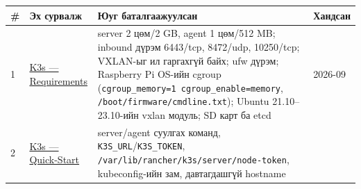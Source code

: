\begingroup\scriptsize\begin{longtable}[]{@{}llll@{}}
\toprule
\begin{minipage}[b]{0.22\columnwidth}\raggedright
\#\strut
\end{minipage} & \begin{minipage}[b]{0.22\columnwidth}\raggedright
Эх сурвалж\strut
\end{minipage} & \begin{minipage}[b]{0.22\columnwidth}\raggedright
Юуг баталгаажуулсан\strut
\end{minipage} & \begin{minipage}[b]{0.22\columnwidth}\raggedright
Хандсан\strut
\end{minipage}\tabularnewline
\midrule
\endhead
\begin{minipage}[t]{0.22\columnwidth}\raggedright
1\strut
\end{minipage} & \begin{minipage}[t]{0.22\columnwidth}\raggedright
\href{https://docs.k3s.io/installation/requirements}{K3s --- Requirements}\strut
\end{minipage} & \begin{minipage}[t]{0.22\columnwidth}\raggedright
server 2 цөм/2 GB, agent 1 цөм/512 MB; inbound дүрэм 6443/tcp, 8472/udp, 10250/tcp; VXLAN-ыг ил гаргахгүй байх; ufw дүрэм; Raspberry Pi OS-ийн cgroup (\texttt{cgroup\_\allowbreak{}memory=\allowbreak{}1\ cgroup\_\allowbreak{}enable=\allowbreak{}memory}, \texttt{/\allowbreak{}boot/\allowbreak{}firmware/\allowbreak{}cmdline.\allowbreak{}txt}); Ubuntu 21.10--23.10-ийн vxlan модуль; SD карт ба etcd\strut
\end{minipage} & \begin{minipage}[t]{0.22\columnwidth}\raggedright
2026-09\strut
\end{minipage}\tabularnewline
\begin{minipage}[t]{0.22\columnwidth}\raggedright
2\strut
\end{minipage} & \begin{minipage}[t]{0.22\columnwidth}\raggedright
\href{https://docs.k3s.io/quick-start}{K3s --- Quick-Start}\strut
\end{minipage} & \begin{minipage}[t]{0.22\columnwidth}\raggedright
server/agent суулгах команд, \texttt{K3S\_URL}/\allowbreak\texttt{K3S\_TOKEN}, \texttt{/\allowbreak{}var/\allowbreak{}lib/\allowbreak{}rancher/\allowbreak{}k3s/\allowbreak{}server/\allowbreak{}node-token}, kubeconfig-ийн зам, давтагдашгүй hostname\strut

\end{minipage}
\end{longtable}
